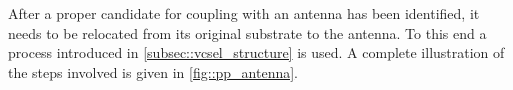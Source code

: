 			After a proper candidate for coupling with an antenna has been identified, it needs to be relocated from its original substrate to the antenna. To this end a \pp process introduced in \autoref{subsec::vcsel_structure} is used. A complete illustration of the steps involved is given in \autoref{fig::pp_antenna}.

			\begin{figure}[htp]
				\begin{subfigure}[t]{ 0.49\linewidth}
					\centering
					\caption{}
					\label{subfig::pp_target_antenna}
				\end{subfigure}
				\hfill
				\begin{subfigure}[t]{ 0.49\linewidth}
					\centering

\end{subfigure}
\end{figure}
